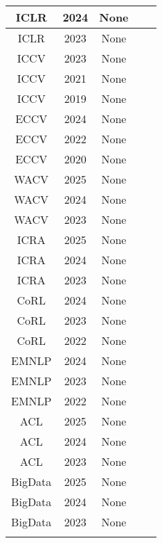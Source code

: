 \begin{table}[!ht]
\begin{center}
\begin{tabular}{ |c|c|c|c|c| }
 ICLR & 2024 & None \\ \hline
 ICLR & 2023 & None \\ \hline
 ICCV & 2023 & None \\ \hline
 ICCV & 2021 & None \\ \hline
 ICCV & 2019 & None \\ \hline
 ECCV & 2024 & None \\ \hline
 ECCV & 2022 & None \\ \hline
 ECCV & 2020 & None \\ \hline
 WACV & 2025 & None \\ \hline
 WACV & 2024 & None \\ \hline
 WACV & 2023 & None \\ \hline
 ICRA & 2025 & None \\ \hline
 ICRA & 2024 & None \\ \hline
 ICRA & 2023 & None \\ \hline
 CoRL & 2024 & None \\ \hline
 CoRL & 2023 & None \\ \hline
 CoRL & 2022 & None \\ \hline
 EMNLP & 2024 & None \\ \hline
 EMNLP & 2023 & None \\ \hline
 EMNLP & 2022 & None \\ \hline
 ACL & 2025 & None \\ \hline
 ACL & 2024 & None \\ \hline
 ACL & 2023 & None \\ \hline
 BigData & 2025 & None \\ \hline
 BigData & 2024 & None \\ \hline
 BigData & 2023 & None \\ \hline
 \fi
\end{tabular}
\end{center}
\end{table}
